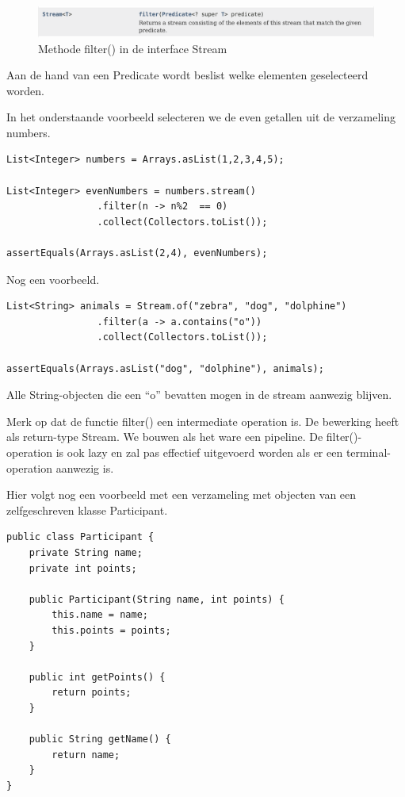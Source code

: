 \documentclass{tstextbook}
\begin{document}
\begin{figure}[H]
  \includegraphics[width=\linewidth]{images/h6/stream_filter.png}
  \caption{Methode filter() in de interface Stream}
  \label{fig:stream_filters}
\end{figure}

Aan de hand van een Predicate wordt beslist welke elementen geselecteerd worden. 

In het onderstaande voorbeeld selecteren we de even getallen uit de verzameling numbers.

\begin{lstlisting}
List<Integer> numbers = Arrays.asList(1,2,3,4,5);

List<Integer> evenNumbers = numbers.stream()
				.filter(n -> n%2  == 0)
				.collect(Collectors.toList());
				
assertEquals(Arrays.asList(2,4), evenNumbers);
\end{lstlisting}

Nog een voorbeeld.

\begin{lstlisting}
List<String> animals = Stream.of("zebra", "dog", "dolphine")
				.filter(a -> a.contains("o"))
				.collect(Collectors.toList());

assertEquals(Arrays.asList("dog", "dolphine"), animals);
\end{lstlisting}

Alle String-objecten die een ``o'' bevatten mogen in de stream aanwezig blijven.

Merk op dat de functie filter() een intermediate operation is. De bewerking heeft als return-type Stream. We bouwen als het ware een pipeline. De filter()-operation is ook lazy en zal pas effectief uitgevoerd worden als er een terminal-operation aanwezig is.

Hier volgt nog een voorbeeld met een verzameling met objecten van een zelfgeschreven klasse Participant.

\begin{lstlisting}
public class Participant {
	private String name;
	private int points;

	public Participant(String name, int points) {
		this.name = name;
		this.points = points;
	}

	public int getPoints() {
		return points;
	}

	public String getName() {
		return name;
	}
}
\end{lstlisting}
\end{document}

